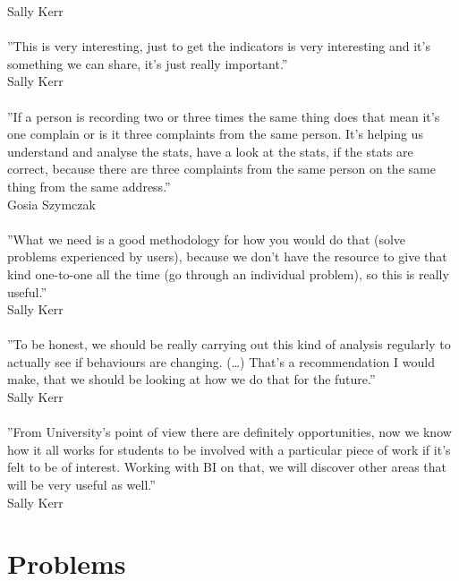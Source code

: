 Sally Kerr\\\\
''This is very interesting, just to get the indicators is very interesting and it’s something we can share, it’s just really important.''\\
Sally Kerr\\\\
''If a person is recording two or three times the same thing does that mean it’s one complain or is it three complaints from the same person. It’s helping us understand and analyse the stats, have a look at the stats, if the stats are correct, because there are three complaints from the same person on the same thing from the same address.''\\
Gosia Szymczak\\\\
''What we need is a good methodology for how you would do that (solve problems experienced by users), because we don’t have the resource to give that kind one-to-one all the time (go through an individual problem), so this is really useful.''\\
Sally Kerr\\\\
''To be honest, we should be really carrying out this kind of analysis regularly to actually see if behaviours are changing. (…) That’s a recommendation I would make, that we should be looking at how we do that for the future.''\\
Sally Kerr\\\\
''From University’s point of view there are definitely opportunities, now we know how it all works for students to be involved with a particular piece of work if it’s felt to be of interest. Working with BI on that, we will discover other areas that will be very useful as well.''\\
Sally Kerr\\

	\section{Problems}
	
